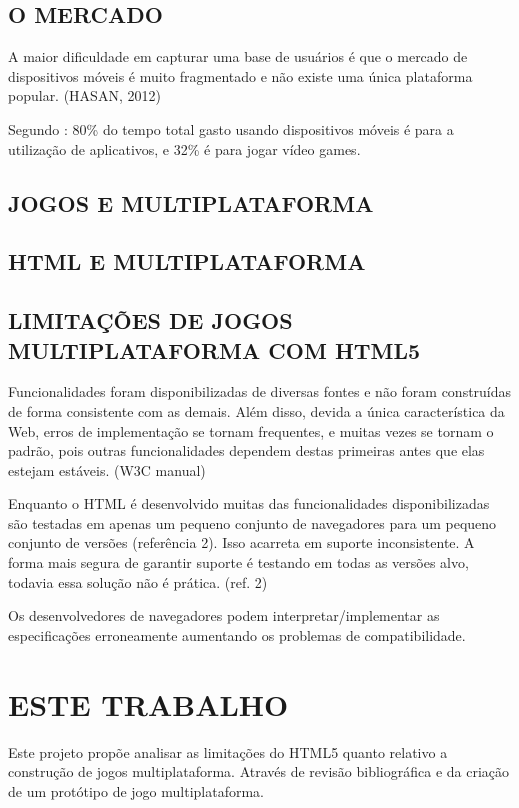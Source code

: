 \documentclass[
12pt,
a4paper,
portuges,
draft
]{report}
\begin{document}
\subsection{O MERCADO}

A maior dificuldade em capturar uma base de usuários é que o mercado
de dispositivos móveis é muito fragmentado e não existe uma única
plataforma popular. (HASAN, 2012)

Segundo \cite{HTML5CrossPlatformGameDevelopment}: 80\% do tempo total gasto usando dispositivos móveis é para a utilização de aplicativos, e 32\% é para jogar vídeo games.


\subsection{JOGOS E MULTIPLATAFORMA}

\subsection{HTML E MULTIPLATAFORMA}

\subsection{LIMITAÇÕES DE JOGOS MULTIPLATAFORMA COM HTML5}

Funcionalidades foram disponibilizadas de diversas fontes e não foram
construídas de forma consistente com as demais. Além
disso, devida a única característica da Web, erros de implementação
se tornam frequentes, e muitas vezes se tornam o padrão, pois outras
funcionalidades dependem destas primeiras antes que elas estejam
estáveis. (W3C manual)

Enquanto o HTML é desenvolvido muitas das funcionalidades
disponibilizadas são testadas em apenas um pequeno conjunto de
navegadores para um pequeno conjunto de versões (referência 2). Isso
acarreta em suporte inconsistente. A forma mais segura de garantir
suporte é testando em todas as versões alvo, todavia essa solução
não é prática. (ref. 2)

Os desenvolvedores de navegadores podem interpretar/implementar
as especificações erroneamente aumentando os problemas de
compatibilidade.


\section{ESTE TRABALHO}

Este projeto propõe analisar as limitações do HTML5 quanto relativo
a construção de jogos multiplataforma. Através de revisão
bibliográfica e da criação de um protótipo de jogo multiplataforma.
\end{document}
